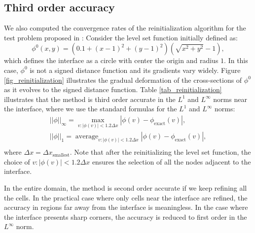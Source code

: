 \documentclass[english]{article}
\DeclareMathOperator*{\avg}{average}
\begin{document}
\subsection{Third order accuracy}\label{subsec_Accuracy_Reinitialization}
We also computed the convergence rates of the reinitialization algorithm
for the test problem proposed in \cite{Russo_Smereka}: Consider the level
set function initially defined as:
$$\phi^0(x,y)=\left(0.1+(x-1)^2+(y-1)^2\right)\left(\sqrt{x^2+y^2}-1\right),$$ which defines the
interface as a circle with center the origin and radius $1$. In this case, $\phi^0$ is not a signed
distance function and its gradients vary widely. Figure \ref{fig_reinitialization} illustrates the
gradual deformation of the cross-sections of $\phi^0$ as it evolves to the signed distance
function. Table \ref{tab_reinitialization} illustrates that the method is third order accurate in
the $L^1$ and $L^\infty$ norms near the interface, where we use the standard formulas for the $L^1$
and $L^\infty$ norms:
\begin{align*}
||\phi||_{\infty}=\max_{v:|\phi(v)|<1.2\Delta x}|\phi(v)-\phi_{\textrm{exact}}(v)|, \\
||\phi||_{1}=\avg_{v:|\phi(v)|<1.2\Delta x}|\phi(v)-\phi_{\textrm{exact}}(v)|, \\
\end{align*}
where $\Delta x=\Delta x_{\textrm{smallest}}$. Note that after the reinitializing the level set
function, the choice of $v:|\phi(v)|<1.2\Delta x$ ensures the selection of all the nodes adjacent
to the interface.

In the entire domain, the method is second order accurate if we keep refining all the cells. In the
practical case where only cells near the interface are refined, the accuracy in regions far away
from the interface is meaningless. In the case where the interface presents sharp corners, the
accuracy is reduced to first order in the $L^{\infty}$ norm.


\end{document}
